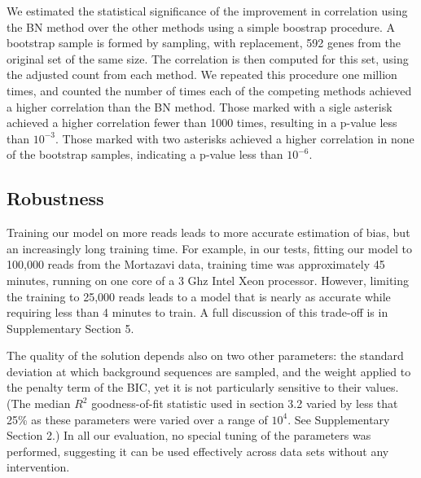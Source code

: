 \documentclass{bioinfo}
\begin{document}
\begin{table}
{
We estimated the statistical significance of the improvement in correlation
using the BN method over the other methods using a simple boostrap procedure. A
bootstrap sample is formed by sampling, with replacement, 592 genes from the
original set of the same size. The correlation is then computed for this set,
using the adjusted count from each method. We repeated this procedure one
million times, and counted the number of times each of the competing methods
achieved a higher correlation than the BN method.  Those marked with a sigle
asterisk achieved a higher correlation fewer than 1000 times, resulting in a
p-value less than $10^{-3}$.  Those marked with two asterisks achieved a higher
correlation in none of the bootstrap samples, indicating a p-value less than
$10^{-6}$.
}
\end{table}

\subsection{Robustness}

Training our model on more reads leads to more accurate estimation of bias, but
an increasingly long training time. For example, in our tests, fitting our model to
100,000 reads from the Mortazavi data, training time was approximately 45
minutes, running on one core of a 3 Ghz Intel Xeon processor. However, limiting
the training to 25,000 reads leads to a model that is nearly as accurate while
requiring less than 4 minutes to train. A full discussion of this trade-off is in
Supplementary Section 5.

The quality of the solution depends also on two other parameters: the standard
deviation at which background sequences are sampled, and the weight applied to
the penalty term of the BIC, yet it is not particularly sensitive to their
values. (The median $R^2$ goodness-of-fit statistic used in section 3.2 varied
by less that 25\% as these parameters were varied over a range of $10^4$. See
Supplementary Section 2.) In all our evaluation, no special tuning of the
parameters was performed, suggesting it can be used effectively across data sets
without any intervention.
\end{document}
